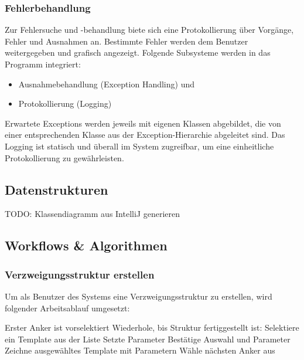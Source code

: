 \subsubsection{Fehlerbehandlung}
Zur Fehlersuche und -behandlung biete sich eine Protokollierung über Vorgänge, Fehler und Ausnahmen an.
Bestimmte Fehler werden dem Benutzer weitergegeben und grafisch angezeigt.
Folgende Subsysteme werden in das Programm integriert:
\begin{itemize}
    \item Ausnahmebehandlung (Exception Handling) und
    \item Protokollierung (Logging)
\end{itemize}
Erwartete Exceptions werden jeweils mit eigenen Klassen abgebildet, die von einer entsprechenden Klasse aus der
Exception-Hierarchie abgeleitet sind.
Das Logging ist statisch und überall im System zugreifbar, um eine einheitliche Protokollierung zu gewährleisten.

\subsection{Datenstrukturen}
TODO: Klassendiagramm aus IntelliJ generieren

\subsection{Workflows \& Algorithmen}

\subsubsection*{Verzweigungsstruktur erstellen}
Um als Benutzer des Systems eine Verzweigungsstruktur zu erstellen, wird folgender Arbeitsablauf umgesetzt:
\begin{algorithm}[caption={Erstellen einer Verzweigungsstruktur}, label={alg1}]
    Erster Anker ist vorselektiert
    Wiederhole, bis Struktur fertiggestellt ist:
        Selektiere ein Template aus der Liste
        Setzte Parameter
        Bestätige Auswahl und Parameter
        Zeichne ausgewähltes Template mit Parametern
        Wähle nächsten Anker aus
\end{algorithm}

